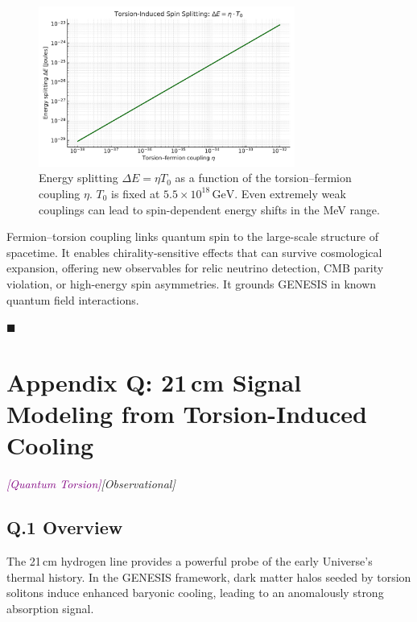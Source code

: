 \documentclass{article}
\newcommand{\quantumtag}{\textcolor{purple}{\textit{[Quantum Torsion]}}}
\newcommand{\obstag}{\textcolor{green!60!black}{\textit{[Observational]}}}
\begin{document}
\begin{figure}[h!]
\centering
\includegraphics[width=0.75\textwidth]{Spin_Splitting_vs_Eta.pdf}
\caption{Energy splitting \(\Delta E = \eta T_0\) as a function of the torsion–fermion coupling \(\eta\). \(T_0\) is fixed at \(5.5 \times 10^{18}\,\mathrm{GeV}\). Even extremely weak couplings can lead to spin-dependent energy shifts in the MeV range.}
\label{fig:spin_splitting}
\end{figure}

\begin{tcolorbox}[colback=gray!5, colframe=black!30, title=Why this matters]
Fermion–torsion coupling links quantum spin to the large-scale structure of spacetime. It enables chirality-sensitive effects that can survive cosmological expansion, offering new observables for relic neutrino detection, CMB parity violation, or high-energy spin asymmetries. It grounds GENESIS in known quantum field interactions.
\end{tcolorbox}

\hfill$\blacksquare$




\section*{Appendix Q: 21\,cm Signal Modeling from Torsion-Induced Cooling}
\label{app:21cm}
\quantumtag  \obstag


\subsection*{Q.1 Overview}
The 21\,cm hydrogen line provides a powerful probe of the early Universe's thermal history. In the GENESIS framework, dark matter halos seeded by torsion solitons induce enhanced baryonic cooling, leading to an anomalously strong absorption signal.
\end{document}
